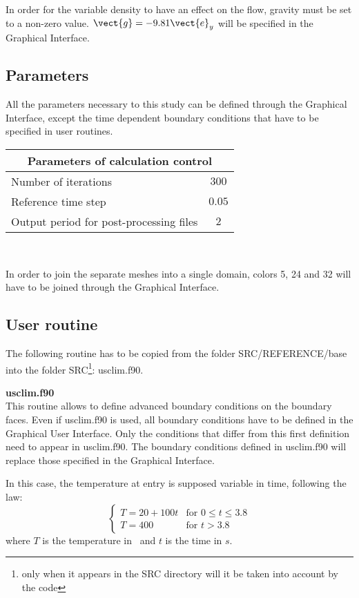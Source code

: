 In order for the variable density to have an effect on the flow, gravity must be
set to a non-zero value. $\vect{g} = -9.81 \vect{e}_y$ will be specified in the
Graphical Interface.


        \subsection{Parameters}

All the parameters necessary to this study can be defined through the Graphical
Interface, except the time dependent boundary conditions that have to be specified 
in user routines.

\begin{center}
\begin{tabular}{|l|c|}
\hline
\multicolumn{2}{|c|}{Parameters of calculation control} \\
\hline
Number of iterations & $300$ \\
\hline
Reference time step & $0.05$ \\
\hline
Output period for post-processing files& $2$ \\
\hline
\end{tabular}\\
\end{center}

In order to join the separate meshes into a single domain, colors 5, 24 and 32
will have to be joined through the Graphical Interface.


        \subsection{User routine}

The following routine has to be copied from the folder SRC/REFERENCE/base into the
folder SRC\footnote{only when it appears in the SRC directory will it be
taken into account by the code}: usclim.f90.

{\bfseries usclim.f90}\\
This routine allows to define advanced boundary conditions on the boundary
faces. Even if usclim.f90 is used, all boundary conditions have to be defined in
the Graphical User Interface. Only the conditions that differ from this first
definition need to appear in usclim.f90. The boundary conditions defined in usclim.f90
will replace those specified in the Graphical Interface.

In this case, the temperature at entry is supposed variable in time, following
the law:
\begin{equation}
\left\{\begin{array}{ll}
T = 20 + 100t & \text{for }0\leqslant t \leqslant 3.8\\
T = 400 & \text{for } t > 3.8
\end{array}\right.
\end{equation}
where $T$ is the temperature in \degresC\ and $t$ is the time in $s$.


